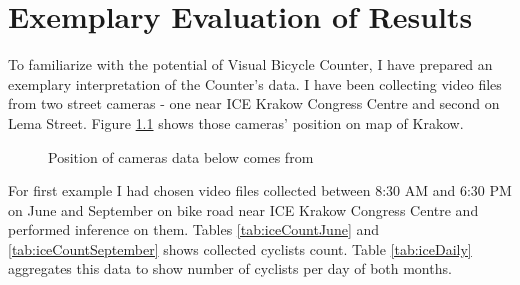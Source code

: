 \chapter{Exemplary Evaluation of Results}
\label{cha:results}
To familiarize with the potential of Visual Bicycle Counter, I have prepared an exemplary interpretation of the Counter's data. I have been collecting video files from two street cameras - one near ICE Krakow Congress Centre and second on Lema Street. Figure \ref{fig:map} shows those cameras' position on map of Krakow.
\begin{figure}[H]
    \centering
    \caption{Position of cameras data below comes from\cite{mapa}}
    \label{fig:map}
\end{figure}
For first example I had chosen video files collected between 8:30 AM and 6:30 PM on June and September on bike road near ICE Krakow Congress Centre and performed inference on them. Tables \ref{tab:iceCountJune} and \ref{tab:iceCountSeptember} shows collected cyclists count. Table \ref{tab:iceDaily} aggregates this data to show number of cyclists per day of both months.
